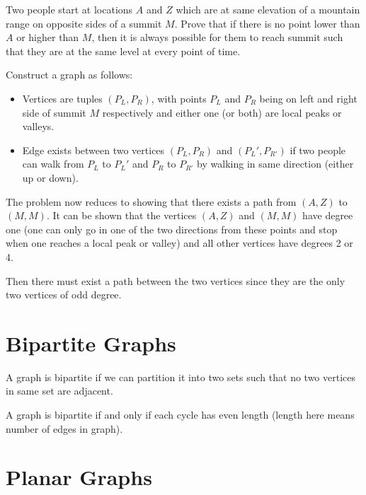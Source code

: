 \documentclass[10pt]{article}
\begin{document}
\begin{problem}
    Two people start at locations $A$ and $Z$ which are at same elevation of a mountain range on opposite sides of a summit $M$. Prove that if there is no point lower than $A$ or higher than $M$, then it is always possible for them to reach summit such that they are at the same level at every point of time.
\end{problem}

\begin{solution}
    Construct a graph as follows:

    \begin{itemize}
        \item Vertices are tuples $(P_L, P_R)$, with points $P_L$ and $P_R$ being on left and right side of summit $M$ respectively and either one (or both) are local peaks or valleys.
        \item Edge exists between two vertices $(P_L, P_R)$ and $(P_L', P_{R'})$ if two people can walk from $P_L$ to $P_L'$ and $P_R$ to $P_{R'}$ by walking in same direction (either up or down).
    \end{itemize}

    The problem now reduces to showing that there exists a path from $(A, Z)$ to $(M,M)$. It can be shown that the vertices $(A, Z)$ and $(M,M)$ have degree one (one can only go in one of the two directions from these points and stop when one reaches a local peak or valley) and all other vertices have degrees 2 or 4. 

    Then there must exist a path between the two vertices since they are the only two vertices of odd degree.
\end{solution}

\section{Bipartite Graphs}

\begin{definition}
    A graph is bipartite if we can partition it into two sets such that no two vertices in same set are adjacent.
\end{definition}

\begin{theorem}
    A graph is bipartite if and only if each cycle has even length (length here means number of edges in graph).
\end{theorem}

\section{Planar Graphs}
\end{document}
